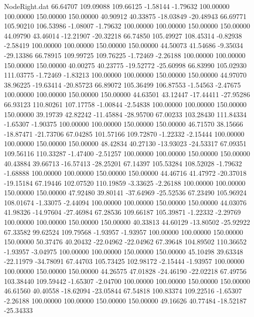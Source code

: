 \begin{filecontents}{NodeRight.dat}
  66.64707  109.09088  109.66125    -1.58144   -1.79632  100.00000  100.00000  150.00000  150.00000   40.90912   40.33875  -18.03849  -20.48943
  66.69771  105.90210  106.53986    -1.08007   -1.79632  100.00000  100.00000  150.00000  150.00000   44.09790   43.46014  -12.21907  -20.32218
  66.74850  105.49927  108.45314    -0.82938   -2.58419  100.00000  100.00000  150.00000  150.00000   44.50073   41.54686   -9.35034  -29.13386
  66.78915  109.99725  109.76225    -1.72469   -2.26188  100.00000  100.00000  150.00000  150.00000   40.00275   40.23775  -19.52772  -25.60998
  66.83990  105.02930  111.03775    -1.72469   -1.83213  100.00000  100.00000  150.00000  150.00000   44.97070   38.96225  -19.63414  -20.85723
  66.89072  105.36499  106.87553    -1.54563   -2.47675  100.00000  100.00000  150.00000  150.00000   44.63501   43.12447  -17.44411  -27.95286
  66.93123  110.80261  107.17758    -1.00844   -2.54838  100.00000  100.00000  150.00000  150.00000   39.19739   42.82242  -11.45884  -28.95700
  67.00233  103.28430  111.84334    -1.65307   -1.90375  100.00000  100.00000  150.00000  150.00000   46.71570   38.15666  -18.87471  -21.73706
  67.04285  101.57166  109.72870    -1.22332   -2.15444  100.00000  100.00000  150.00000  150.00000   48.42834   40.27130  -13.93023  -24.53317
  67.09351  109.56116  110.33287    -1.47400   -2.51257  100.00000  100.00000  150.00000  150.00000   40.43884   39.66713  -16.57413  -28.25201
  67.14397  105.53284  108.52028    -1.79632   -1.68888  100.00000  100.00000  150.00000  150.00000   44.46716   41.47972  -20.37018  -19.15184
  67.19446  102.07520  110.19859    -3.33625   -2.26188  100.00000  100.00000  150.00000  150.00000   47.92480   39.80141  -37.64969  -25.52536
  67.23490  105.96924  108.01674    -1.33075   -2.44094  100.00000  100.00000  150.00000  150.00000   44.03076   41.98326  -14.97604  -27.46984
  67.28536  109.66187  105.39871    -1.22332   -2.29769  100.00000  100.00000  150.00000  150.00000   40.33813   44.60129  -13.80502  -25.92922
  67.33582   99.62524  109.79568    -1.93957   -1.93957  100.00000  100.00000  150.00000  150.00000   50.37476   40.20432  -22.04962  -22.04962
  67.39648  104.89502  110.36652    -1.93957   -3.04975  100.00000  100.00000  150.00000  150.00000   45.10498   39.63348  -22.11979  -34.78091
  67.44703  105.73425  102.98172    -2.15444   -1.93957  100.00000  100.00000  150.00000  150.00000   44.26575   47.01828  -24.46190  -22.02218
  67.49756  103.38440  109.59442    -1.65307   -2.04700  100.00000  100.00000  150.00000  150.00000   46.61560   40.40558  -18.62094  -23.05844
  67.54818  100.83374  109.22516    -1.65307   -2.26188  100.00000  100.00000  150.00000  150.00000   49.16626   40.77484  -18.52187  -25.34333

\end{filecontents}
